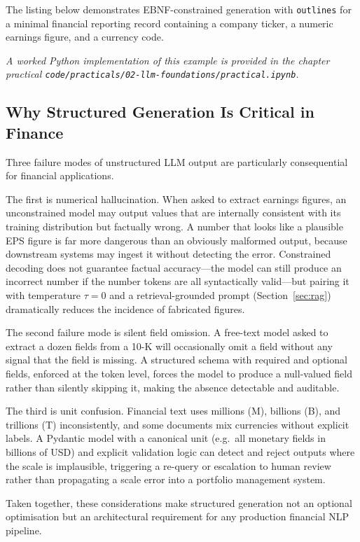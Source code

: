 \begin{context}
The listing below demonstrates EBNF-constrained generation with \texttt{outlines}
for a minimal financial reporting record containing a company ticker, a numeric
earnings figure, and a currency code.

\textit{A worked Python implementation of this example is provided in the chapter practical \texttt{code/practicals/02-llm-foundations/practical.ipynb}.}

\subsection{Why Structured Generation Is Critical in Finance}
\label{sec:structured-gen-finance}

Three failure modes of unstructured LLM output are particularly consequential for
financial applications.

The first is numerical hallucination.  When asked to extract earnings figures, an
unconstrained model may output values that are internally consistent with its training
distribution but factually wrong.  A number that looks like a plausible EPS figure
is far more dangerous than an obviously malformed output, because downstream systems
may ingest it without detecting the error.  Constrained decoding does not guarantee
factual accuracy---the model can still produce an incorrect number if the number
tokens are all syntactically valid---but pairing it with temperature $\tau = 0$ and
a retrieval-grounded prompt (Section~\ref{sec:rag}) dramatically reduces the incidence
of fabricated figures.

The second failure mode is silent field omission.  A free-text model asked to extract
a dozen fields from a 10-K will occasionally omit a field without any signal that the
field is missing.  A structured schema with required and optional fields, enforced at
the token level, forces the model to produce a null-valued field rather than silently
skipping it, making the absence detectable and auditable.

The third is unit confusion.  Financial text uses millions (M), billions (B), and
trillions (T) inconsistently, and some documents mix currencies without explicit labels.
A Pydantic model with a canonical unit (e.g.\ all monetary fields in billions of USD)
and explicit validation logic can detect and reject outputs where the scale is
implausible, triggering a re-query or escalation to human review rather than propagating
a scale error into a portfolio management system.

Taken together, these considerations make structured generation not an optional
optimisation but an architectural requirement for any production financial NLP pipeline.

\end{context}

